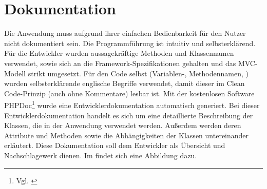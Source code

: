 \section{Dokumentation}
\label{sec:Dokumentation}
Die Anwendung muss aufgrund ihrer einfachen Bedienbarkeit für den Nutzer nicht dokumentiert
sein. Die Programmführung ist intuitiv und selbsterklärend.
Für die Entwickler wurden aussagekräftige Methoden und Klassennamen verwendet, sowie
sich an die Framework-Spezifikationen gehalten und das MVC-Modell strikt umgesetzt.
Für den Code selbst (Variablen-, Methodennamen, \etc) wurden selbsterklärende
englische Begriffe verwendet, damit dieser im Clean Code-Prinzip (auch ohne
Kommentare) lesbar ist.
Mit der kostenlosen Software PHPDoc\footnote{Vgl. \cite{phpdoc}}  wurde eine Entwicklerdokumentation automatisch generiert. Bei dieser Entwicklerdokumentation handelt es sich um eine detaillierte Beschreibung der Klassen, die in der Anwendung verwendet werden. Außerdem werden deren Attribute und Methoden sowie die Abhängigkeiten der Klassen untereinander erläutert. Diese Dokumentation soll dem Entwickler als Übersicht und Nachschlagewerk dienen. Im  findet sich eine Abbildung dazu.

